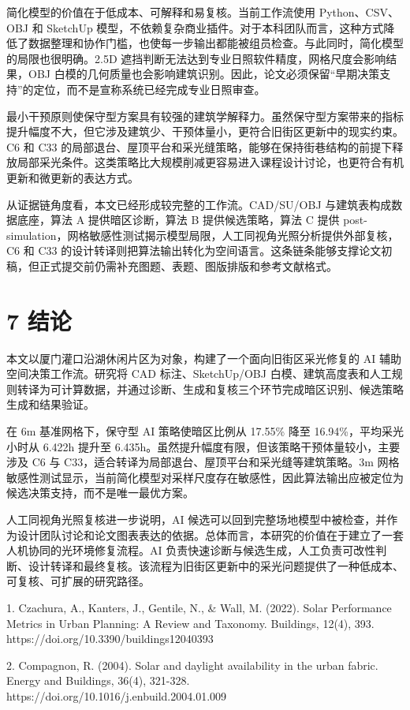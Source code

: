\documentclass[UTF8,zihao=-4,a4paper]{ctexart}
\begin{document}
简化模型的价值在于低成本、可解释和易复核。当前工作流使用 Python、CSV、OBJ 和 SketchUp 模型，不依赖复杂商业插件。对于本科团队而言，这种方式降低了数据整理和协作门槛，也使每一步输出都能被组员检查。与此同时，简化模型的局限也很明确。2.5D 遮挡判断无法达到专业日照软件精度，网格尺度会影响结果，OBJ 白模的几何质量也会影响建筑识别。因此，论文必须保留“早期决策支持”的定位，而不是宣称系统已经完成专业日照审查。

最小干预原则使保守型方案具有较强的建筑学解释力。虽然保守型方案带来的指标提升幅度不大，但它涉及建筑少、干预体量小，更符合旧街区更新中的现实约束。C6 和 C33 的局部退台、屋顶平台和采光缝策略，能够在保持街巷结构的前提下释放局部采光条件。这类策略比大规模削减更容易进入课程设计讨论，也更符合有机更新和微更新的表达方式。

从证据链角度看，本文已经形成较完整的工作流。CAD/SU/OBJ 与建筑表构成数据底座，算法 A 提供暗区诊断，算法 B 提供候选策略，算法 C 提供 post-simulation，网格敏感性测试揭示模型局限，人工同视角光照分析提供外部复核，C6 和 C33 的设计转译则把算法输出转化为空间语言。这条链条能够支撑论文初稿，但正式提交前仍需补充图题、表题、图版排版和参考文献格式。

\section{7 结论}
本文以厦门灌口沿湖休闲片区为对象，构建了一个面向旧街区采光修复的 AI 辅助空间决策工作流。研究将 CAD 标注、SketchUp/OBJ 白模、建筑高度表和人工规则转译为可计算数据，并通过诊断、生成和复核三个环节完成暗区识别、候选策略生成和结果验证。

在 6m 基准网格下，保守型 AI 策略使暗区比例从 17.55\% 降至 16.94\%，平均采光小时从 6.422h 提升至 6.435h。虽然提升幅度有限，但该策略干预体量较小，主要涉及 C6 与 C33，适合转译为局部退台、屋顶平台和采光缝等建筑策略。3m 网格敏感性测试显示，当前简化模型对采样尺度存在敏感性，因此算法输出应被定位为候选决策支持，而不是唯一最优方案。

人工同视角光照复核进一步说明，AI 候选可以回到完整场地模型中被检查，并作为设计团队讨论和论文图表表达的依据。总体而言，本研究的价值在于建立了一套人机协同的光环境修复流程。AI 负责快速诊断与候选生成，人工负责可改性判断、设计转译和最终复核。该流程为旧街区更新中的采光问题提供了一种低成本、可复核、可扩展的研究路径。

1. Czachura, A., Kanters, J., Gentile, N., \& Wall, M. (2022). Solar Performance Metrics in Urban Planning: A Review and Taxonomy. Buildings, 12(4), 393. https://doi.org/10.3390/buildings12040393

2. Compagnon, R. (2004). Solar and daylight availability in the urban fabric. Energy and Buildings, 36(4), 321-328. https://doi.org/10.1016/j.enbuild.2004.01.009
\end{document}
